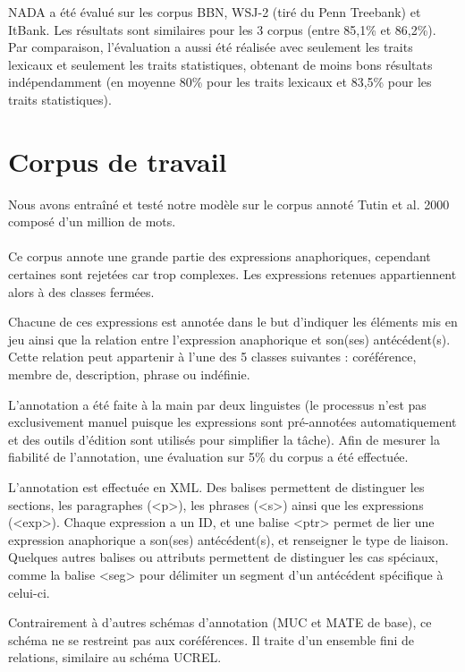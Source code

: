\documentclass[a4paper,12pt]{article}
\begin{document}
NADA a été évalué sur les corpus BBN\cite{BBN}, WSJ-2 (tiré du Penn Treebank\cite{Marcus:1993:BLA:972470.972475}) et ItBank\cite{Bergsma08distributionalidentification}. Les résultats sont similaires pour les 3 corpus (entre 85,1\% et 86,2\%). Par comparaison, l'évaluation a aussi été réalisée avec seulement les traits lexicaux et seulement les traits statistiques, obtenant de moins bons résultats indépendamment (en moyenne 80\% pour les traits lexicaux et 83,5\% pour les traits statistiques).

\section{Corpus de travail}

Nous avons entraîné et testé notre modèle sur le corpus annoté Tutin et al. 2000 composé d'un million de mots.

\paragraph{}
Ce corpus annote une grande partie des expressions anaphoriques, cependant certaines sont rejetées car trop complexes. Les expressions retenues appartiennent alors à des classes fermées.

Chacune de ces expressions est annotée dans le but d'indiquer les éléments mis en jeu ainsi que la relation entre l'expression anaphorique et son(ses) antécédent(s). Cette relation peut appartenir à l'une des 5 classes suivantes : coréférence, membre de, description, phrase ou indéfinie.

L'annotation a été faite à la main par deux linguistes (le processus n'est pas exclusivement manuel puisque les expressions sont pré-annotées automatiquement et des outils d'édition sont utilisés pour simplifier la tâche). Afin de mesurer la fiabilité de l'annotation, une évaluation sur 5\% du corpus a été effectuée.

L'annotation est effectuée en XML. Des balises permettent de distinguer les sections, les paragraphes (<p>), les phrases (<s>) ainsi que les expressions (<exp>). Chaque expression a un ID, et une balise <ptr> permet de lier une expression anaphorique a son(ses) antécédent(s), et renseigner le type de liaison. Quelques autres balises ou attributs permettent de distinguer les cas spéciaux, comme la balise <seg> pour délimiter un segment d'un antécédent spécifique à celui-ci.

Contrairement à d'autres schémas d'annotation (MUC\cite{hirschman-97} et MATE\cite{mate} de base), ce schéma ne se restreint pas aux coréférences. Il traite d'un ensemble fini de relations, similaire au schéma UCREL\cite{Rayson2004}.
\end{document}
